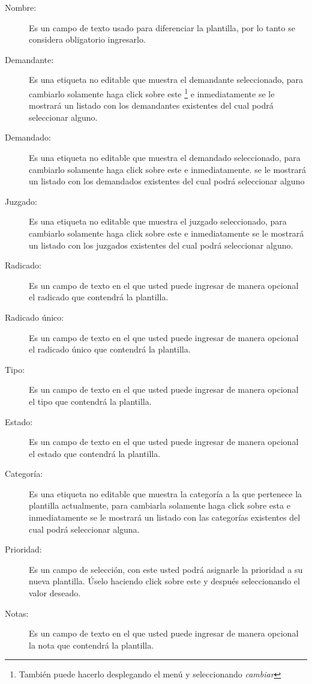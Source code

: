 \begin{description}
\item[Nombre:]Es un campo de texto usado para diferenciar la plantilla, por lo
tanto se considera obligatorio ingresarlo.
\item[Demandante:]Es una etiqueta no editable que muestra el demandante
seleccionado, para cambiarlo solamente haga click sobre este
\footnote{Tambi\'en puede hacerlo desplegando el men\'u \blackberry y
seleccionando \emph{cambiar}}
e inmediatamente se
le mostrar\'a un listado con los demandantes existentes del cual podr\'a
seleccionar alguno.
\item[Demandado:]Es una etiqueta no editable que muestra el demandado
seleccionado, para cambiarlo solamente haga click sobre este
\footnotemark[\value{footnote}]
e inmediatamente.
se le mostrar\'a un listado con los demandados existentes del cual podr\'a
seleccionar alguno
\item[Juzgado:]Es una etiqueta no editable que muestra el juzgado
seleccionado, para cambiarlo solamente haga click sobre este
\footnotemark[\value{footnote}]
e inmediatamente
se le mostrar\'a un listado con los juzgados existentes del cual podr\'a
seleccionar alguno.
\item[Radicado:]Es un campo de texto en el que usted puede ingresar de manera
opcional el radicado que contendr\'a la plantilla.
\item[Radicado \'unico:]Es un campo de texto en el que usted puede ingresar de
manera opcional el radicado \'unico que contendr\'a la plantilla.
\item[Tipo:]Es un campo de texto en el que usted puede ingresar de manera
opcional el tipo que contendr\'a la plantilla.
\item[Estado:]Es un campo de texto en el que usted puede ingresar de manera
opcional el estado que contendr\'a la plantilla.
\item[Categor\'ia:]Es una etiqueta no editable que muestra la categor\'ia
a la que pertenece la plantilla actualmente, para cambiarla solamente haga click
sobre esta
\footnotemark[\value{footnote}]
e inmediatamente
se le mostrar\'a un listado con las categor\'ias existentes del cual podr\'a
seleccionar alguna.
\item[Prioridad:]Es un campo de selecci\'on, con este usted podr\'a asignarle
la prioridad a su nueva plantilla. \'Uselo haciendo click sobre este y
despu\'es seleccionando el valor deseado.
\item[Notas:]Es un campo de texto en el que usted puede ingresar de manera
opcional la nota que contendr\'a la plantilla.
\end{description}

